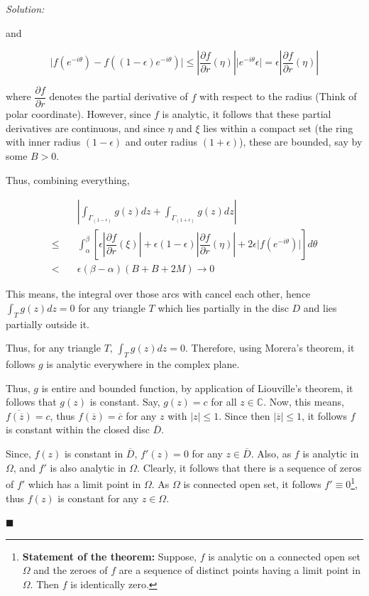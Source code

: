 \documentclass[12pt]{article}
\newcommand{\C}{\mathbb{C}}
\theoremstyle{definition}
\newenvironment{answer}{\textit{Solution: }\quad }{ \hfill $\blacksquare$}
\numberwithin{equation}{section}
\begin{document}
\begin{answer}
\begin{enumerate}
\begin{enumerate}
			and 

			$$
			\vert f(e^{-i\theta}) - f((1-\epsilon)e^{-i\theta}) \vert \leq \left\vert \dfrac{\partial f}{\partial r}(\eta)\right\vert \vert e^{-i\theta} \epsilon \vert = \epsilon \left\vert \dfrac{\partial f}{\partial r}(\eta)\right\vert
			$$

			where $\dfrac{\partial f}{\partial r}$ denotes the partial derivative of $f$ with respect to the radius (Think of polar coordinate). However, since $f$ is analytic, it follows that these partial derivatives are continuous, and since $\eta$ and $\xi$ lies within a compact set (the ring with inner radius $(1 - \epsilon)$ and outer radius $(1 + \epsilon)$), these are bounded, say by some $B > 0$.

			Thus, combining everything,

			\begin{align*}
				& \left\vert \int_{\Gamma_{(1 - \epsilon)}} g(z)dz + \int_{\Gamma_{(1 + \epsilon)}} g(z)dz \right\vert\\
				\leq \quad & \int_{\alpha}^{\beta} \left[ \epsilon \left\vert \dfrac{\partial f}{\partial r}(\xi) \right\vert + \epsilon(1 - \epsilon) \left\vert \dfrac{\partial f}{\partial r}(\eta) \right\vert + 2\epsilon \vert f(e^{-i\theta}) \vert \right]d\theta\\
				< \quad & \epsilon (\beta - \alpha) (B + B + 2M) \rightarrow 0
			\end{align*}

			This means, the integral over those arcs with cancel each other, hence $\int_T g(z)dz = 0$ for any triangle $T$ which lies partially in the disc $D$ and lies partially outside it.

			Thus, for any triangle $T$, $\int_T g(z)dz = 0$. Therefore, using Morera's theorem, it follows $g$ is analytic everywhere in the complex plane.
		\end{enumerate}

		Thus, $g$ is entire and bounded function, by application of Liouville's theorem, it follows that $g(z)$ is constant. Say, $g(z) = c$ for all $z \in \C$. Now, this means, $\overline{f(\overline{z})} = c$, thus $f(\overline{z}) = \overline{c}$ for any $z$ with $\vert z \vert \leq 1$. Since then $\vert \overline{z} \vert \leq 1$, it follows $f$ is constant within the closed disc $\overline{D}$. 

		Since, $f(z)$ is constant in $\overline{D}$, $f'(z) = 0$ for any $z \in \overline{D}$. Also, as $f$ is analytic in $\Omega$, and $f'$ is also analytic in $\Omega$. Clearly, it follows that there is a sequence of zeros of $f'$ which has a limit point in $\Omega$. As $\Omega$ is connected open set, it follows $f'\equiv 0$\footnote{\textbf{Statement of the theorem:} Suppose, $f$ is analytic on a connected open set $\Omega$ and the zeroes of $f$ are a sequence of distinct points having a limit point in $\Omega$. Then $f$ is identically zero.}, thus $f(z)$ is constant for any $z \in \Omega$.


\end{enumerate}
\end{answer}
\end{document}
